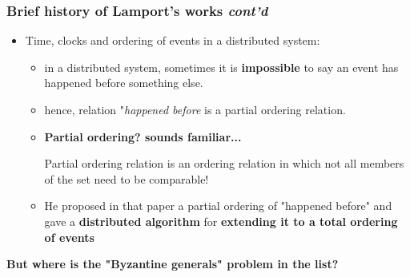 \documentclass[../document.tex]{subfiles}
\begin{document}
\begin{frame}
	\frametitle{Brief history of Lamport's works \textit{cont'd}}
	\begin{itemize}
		\item <1-> Time, clocks and ordering of events in a distributed system:
		\begin{itemize}
			\item<2-> \footnotesize in a distributed system, sometimes it is \textbf{impossible} to say an event has happened before something else. 
			\item <3-7> \footnotesize hence, relation "\textit{happened before} is a partial ordering relation.
			\item <4-5> \textbf{Partial ordering? sounds familiar...}
			\alt<5> {\begin{definition} 
					Partial ordering relation is an ordering relation in which not all members of the set need to be comparable!
			\end{definition}}{}
			\item <6-> \footnotesize He proposed in that paper a partial ordering of "happened before" and gave a \textbf{distributed algorithm} for \textbf{extending it to a total ordering of events}
			\newline \newline
			
			
		\end{itemize}
	\end{itemize}
	 {\centering \large \textbf{But where is the "Byzantine generals" problem in the list?}}
\end{frame}
\end{document}
